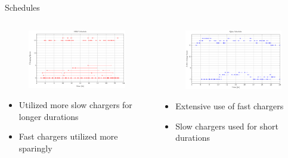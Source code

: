\documentclass[aspectratio=169]{beamer}
\begin{document}
\begin{frame}[label={sec:org245dec9}]{Schedules}
\begin{columns}
\begin{column}{0.5\columnwidth}
\begin{figure}[htpb]
\centering
    \includegraphics[width=\textwidth]{img/milp-pap/schedule-milp-pap}
\end{figure}

\begin{itemize}
\item Utilized more slow chargers for longer durations
\item Fast chargers utilized more sparingly
\end{itemize}
\end{column}

\begin{column}{0.5\columnwidth}
\begin{figure}[htpb]
\centering
    \includegraphics[width=\textwidth]{img/milp-pap/schedule-qin}
\end{figure}

\begin{itemize}
\item Extensive use of fast chargers
\item Slow chargers used for short durations
\end{itemize}
\end{column}
\end{columns}
\end{frame}
\end{document}
